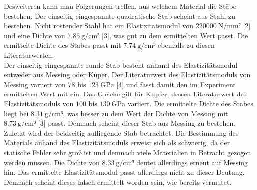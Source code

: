Desweiteren kann man Folgerungen treffen, aus welchem Material die 
Stäbe bestehen. Der einseitig eingespannte quadratische Stab scheint aus
Stahl zu bestehen. Nicht rostender Stahl hat ein Elastizitätsmodul von 
$\SI{220000}{\newton\per\milli\meter²}$ [2] und eine Dichte von 
$\SI{7.85}{\gram\per\centi\meter³}$ [3], was gut zu dem ermittelten 
Wert passt. Die ermittelte Dichte des Stabes passt mit 
$\SI{7.74}{\gram\per\centi\meter³}$ ebenfalls zu diesen Literaturwerten.
\\
Der einseitig eingespannte runde Stab besteht anhand des Elastizitätsmodul
entweder aus Messing oder Kuper. Der Literaturwert des Elastizitätsmoduls
von Messing variiert von $\num{78}$ bis $ \SI{123}{\giga\pascal}$ [4] und fasst
damit den im Experiment ermittelten Wert mit ein. Das Gleiche gilt für 
Kupfer, dessen Literaturwert des Elastizitätsmoduls von
$\num{100}$ bis $\SI{130}{\giga\pascal}$ variiert. Die ermittelte Dichte des 
Stabes liegt bei $\SI{8.31}{\gram\per\centi\meter³}$, was besser zu dem Wert 
der Dichte von Messing mit $\SI{8.73}{\gram\per\centi\meter³}$ [3] passt. 
Demnach scheint dieser Stab aus Messing zu bestehen. 
\\
Zuletzt wird der beidseitig aufliegende Stab betrachtet. Die Bestimmung 
des Materials anhand des Elastizitätsmoduls erweist sich als schwierig, 
da der statische Fehler sehr groß ist und demnach viele Materialien in
Betracht gezogen werden müssen. Die Dichte von $\SI{8.33}{\gram\per\centi\meter³}$
deutet allerdings erneut auf Messing hin. Das ermittelte Elastizitätsmodul
passt allerdings nicht zu dieser Deutung. Demnach scheint dieses falsch 
ermittelt worden sein, wie bereits vermutet. 